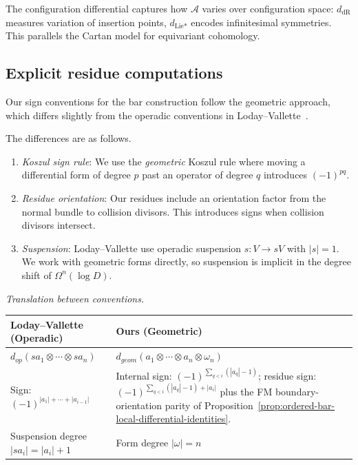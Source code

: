 \begin{remark}
 The configuration differential captures how $\mathcal{A}$ varies over configuration space: $d_{\text{dR}}$ measures variation of insertion points, $d_{\text{Lie*}}$ encodes infinitesimal symmetries. This parallels the Cartan model for equivariant cohomology.
 \end{remark}

\subsection{Explicit residue computations}\label{sec:residue-calculus}

\begin{lemma}
\label{lem:LV-sign-comparison}
\label{rem:LV-signs}
Our sign conventions for the bar construction follow the geometric approach, which differs slightly from the operadic conventions in Loday--Vallette~\cite{LV12}.

The differences are as follows.
\begin{enumerate}
\item \emph{Koszul sign rule}: We use the \emph{geometric} Koszul rule where moving a differential form of degree $p$ past an operator of degree $q$ introduces $(-1)^{pq}$.

\item \emph{Residue orientation}: Our residues include an orientation factor from the normal bundle to collision divisors. This introduces signs when collision divisors intersect.

\item \emph{Suspension}: Loday--Vallette use operadic suspension $s: V \to sV$ with $|s| = 1$. We work with geometric forms directly, so suspension is implicit in the degree shift of $\Omega^n(\log D)$.
\end{enumerate}

\emph{Translation between conventions.}
\begin{center}
\begin{tabular}{|>{\raggedright\arraybackslash}p{}|>{\raggedright\arraybackslash}p{}|}
\hline
\textbf{Loday--Vallette (Operadic)} & \textbf{Ours (Geometric)} \\
\hline
$d_{op}(s a_1 \otimes \cdots \otimes s a_n)$ & $d_{geom}(a_1 \otimes \cdots \otimes a_n \otimes \omega_n)$ \\
Sign: $(-1)^{|a_1| + \cdots + |a_{i-1}|}$ &
Internal sign:
$(-1)^{\sum_{q<i}(|a_q|-1)}$; residue sign:
$(-1)^{\sum_{q<i}(|a_q|-1)+|a_i|}$ plus the FM
boundary-orientation parity of
Proposition~\ref{prop:ordered-bar-local-differential-identities}. \\
Suspension degree $|s a_i| = |a_i| + 1$ & Form degree $|\omega| = n$ \\
\hline
\end{tabular}
\end{center}


\end{lemma}
